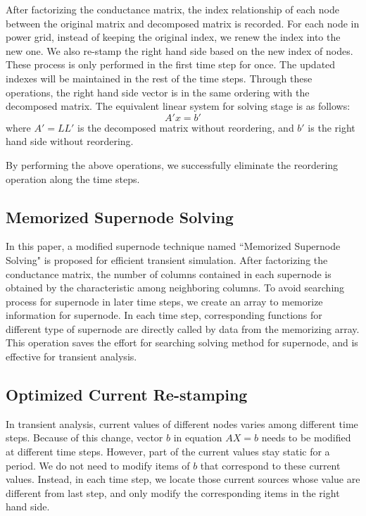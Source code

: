 After factorizing the conductance matrix, the index relationship of each node between the original matrix and decomposed matrix is recorded. For each node in power grid, instead of keeping the original index, we renew the index into the new one. We also re-stamp the right hand side based on the new index of nodes. These process is only performed in the first time step for once. The updated indexes will be maintained in the rest of the time steps. Through these operations, the right hand side vector is
in the same ordering with the decomposed matrix. The equivalent linear system for solving stage is as follows:
\begin{equation}
A'x = b'
\end{equation}
where $A'=LL'$ is the decomposed matrix without reordering, and $b'$ is the right hand side without reordering.

By performing the above operations, we successfully eliminate the reordering operation along the time steps.

  \subsection{Memorized Supernode Solving}
In this paper, a modified supernode technique named ``Memorized Supernode Solving" is proposed for efficient transient simulation. After 
factorizing the conductance matrix, the number of columns contained in each supernode is obtained by the characteristic among 
neighboring columns. To avoid searching process for supernode in later time steps, we create an array to memorize information for supernode. In each time step, corresponding functions for different type of 
supernode are directly called by data from the memorizing array. This operation saves the effort for searching solving method for supernode, and is effective for transient analysis.  

  \subsection{Optimized Current Re-stamping}
In transient analysis, current values of different nodes varies among different time steps. Because of this change, vector $b$ in equation $AX=b$ needs to be modified at different time steps. However, part of the current values stay static for a period. We do not need to modify
items of $b$ that correspond to these current values. Instead, in each time step, we locate those current sources whose value are
different from last step, and only modify the corresponding items in the right hand side. 


